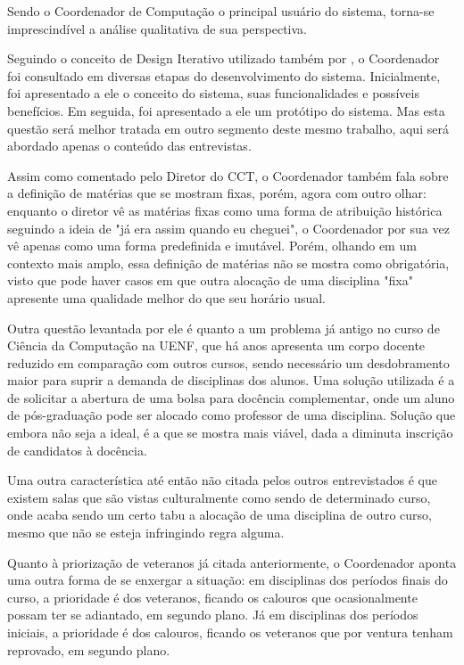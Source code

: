 Sendo o Coordenador de Computação o principal usuário do sistema, torna-se imprescindível a análise qualitativa de sua perspectiva.

Seguindo o conceito de Design Iterativo utilizado também por \cite{andre_interaction_2018}, o Coordenador foi consultado em diversas etapas do desenvolvimento do sistema. Inicialmente, foi apresentado a ele o conceito do sistema, suas funcionalidades e possíveis benefícios. Em seguida, foi apresentado a ele um protótipo do sistema. Mas esta questão será melhor tratada em outro segmento deste mesmo trabalho, aqui será abordado apenas o conteúdo das entrevistas.

Assim como comentado pelo Diretor do CCT, o Coordenador também fala sobre a definição de matérias que se mostram fixas, porém, agora com outro olhar: enquanto o diretor vê as matérias fixas como uma forma de atribuição histórica seguindo a ideia de "já era assim quando eu cheguei", o Coordenador por sua vez vê apenas como uma forma predefinida e imutável. Porém, olhando em um contexto mais amplo, essa definição de matérias não se mostra como obrigatória, visto que pode haver casos em que outra alocação de uma disciplina "fixa" apresente uma qualidade melhor do que seu horário usual.

Outra questão levantada por ele é quanto a um problema já antigo no curso de Ciência da Computação na UENF, que há anos apresenta um corpo docente reduzido em comparação com outros cursos, sendo necessário um desdobramento maior para suprir a demanda de disciplinas dos alunos. Uma solução utilizada é a de solicitar a abertura de uma bolsa para docência complementar, onde um aluno de pós-graduação pode ser alocado como professor de uma disciplina. Solução que embora não seja a ideal, é a que se mostra mais viável, dada a diminuta inscrição de candidatos à docência.

Uma outra característica até então não citada pelos outros entrevistados é que existem salas que são vistas culturalmente como sendo de determinado curso, onde acaba sendo um certo tabu a alocação de uma disciplina de outro curso, mesmo que não se esteja infringindo regra alguma.

Quanto à priorização de veteranos já citada anteriormente, o Coordenador aponta uma outra forma de se enxergar a situação: em disciplinas dos períodos finais do curso, a prioridade é dos veteranos, ficando os calouros que ocasionalmente possam ter se adiantado, em segundo plano. Já em disciplinas dos períodos iniciais, a prioridade é dos calouros, ficando os veteranos que por ventura tenham reprovado, em segundo plano.

